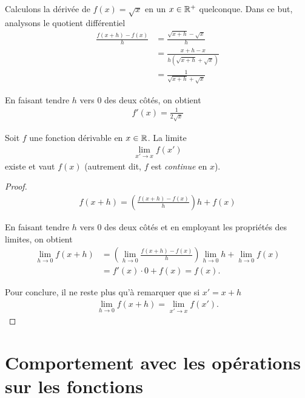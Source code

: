 \documentclass[main.tex]{subfiles}
\begin{document}
\begin{example}

    Calculons la dérivée de $f(x) = \sqrt x$ en un $x \in \mathbb{R}^+$ quelconque.
    Dans ce but,
    analysons le quotient différentiel
    \begin{align}
        \frac {f(x + h) - f(x)} h
        &= \frac {\sqrt {x + h} - \sqrt x} h\\
        &= \frac {x + h - x} {h (\sqrt {x + h} + \sqrt {x})}\\
        &= \frac 1 {\sqrt {x + h} + \sqrt {x}}
    \end{align}

    En faisant tendre $h$ vers $0$ des deux côtés,
    on obtient
    \begin{align}
        f'(x) = \frac 1 {2 \sqrt x}
    \end{align}
\end{example}

\begin{proposition}

    Soit $f$ une fonction dérivable en $x \in \mathbb{R}$.
    La limite
    \begin{align}
        \lim_{x' \to x} f(x')
    \end{align}
    existe et vaut $f(x)$
    (autrement dit, $f$ est \emph{continue} en $x$).
\end{proposition}
\begin{proof}
    \begin{align}
        f(x + h) = \left(\frac {f(x + h) - f(x)} h\right) h + f(x)
    \end{align}

    En faisant tendre $h$ vers $0$ des deux côtés
    et en employant les propriétés des limites,
    on obtient
    \begin{align}
        \lim_{h \to 0} f(x + h)
        &= \left(\lim_{h \to 0} \frac {f(x + h) - f(x)} h\right) \lim_{h \to 0} h + \lim_{h \to 0} f(x)\\
        &= f'(x) \cdot 0 + f(x) = f(x).
    \end{align}

    Pour conclure, il ne reste plus qu'à remarquer que si $x' = x + h$
    \begin{align}
        \lim_{h \to 0} f(x + h) = \lim_{x' \to x} f(x').
    \end{align}
\end{proof}

\section{Comportement avec les opérations sur les fonctions}
\end{document}
